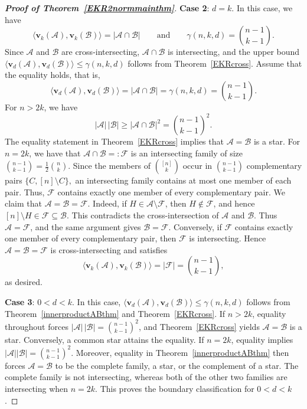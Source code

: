 \documentclass[11pt]{article}
\numberwithin{equation}{section}
\def\A{\mathcal{A}}
\def\B{\mathcal{B}}
\def\F{\mathcal{F}}
\def\v{\mathbf{v}}
\begin{document}
\begin{proof}[{\bf Proof of Theorem~\ref{EKR2normmainthm}}]
{\bf Case 2}: $d=k$.
In this case, we have
\[
\big\langle\mathbf{v}_k(\mathcal{A}),
\mathbf{v}_k(\mathcal{B})\big\rangle
=|\mathcal{A}\cap\mathcal{B}|
\qquad\text{and}\qquad
\gamma(n,k,d)=\binom{n-1}{k-1}.
\]
Since $\mathcal{A}$ and $\mathcal{B}$ are cross-intersecting,
$\mathcal{A}\cap\mathcal{B}$ is intersecting, and the upper bound $\big\langle\mathbf{v}_{d}(\A),\mathbf{v}_{d}(\B)\big\rangle
\leq \gamma(n,k,d)$
follows from Theorem~\ref{EKRcross}.
Assume that the equality holds, that is,
$$\big\langle\mathbf{v}_{d}(\A),\mathbf{v}_{d}(\B)\big\rangle
=|\mathcal{A}\cap\mathcal{B}|= \gamma(n,k,d)=\binom{n-1}{k-1}.$$
For $n>2k$, we have
\[
|\mathcal{A}|\,|\mathcal{B}|
\geq|\mathcal{A}\cap\mathcal{B}|^2
=\binom{n-1}{k-1}^2.
\]
The equality statement in Theorem~\ref{EKRcross} implies that
$\mathcal{A}=\mathcal{B}$ is a star.
For $n=2k$, we have that
$\mathcal A\cap\mathcal B=:\mathcal F$ is an intersecting family of
size $\binom{n-1}{k-1}= \frac{1}{2}\binom{n}{k}$.
Since the members of $\binom{[n]}{k}$ occur in $\binom{n-1}{k-1}$ complementary pairs
$
 \{C,[n]\setminus C\},
$
an intersecting family contains at most one member of each pair.
Thus, $\F$ contains exactly one member of every complementary pair.
We claim that $\A=\B=\F$.  Indeed, if
$H\in\A\setminus\F$, then $H\notin\F$, and hence
$[n]\setminus H\in\F\subseteq\B$.  This contradicts the
cross-intersection of $\A$ and $\B$.  Thus $\A=\F$, and the same
argument gives $\B=\F$.
Conversely, if $\F$ contains exactly one member of every
complementary pair, then $\F$ is intersecting.
Hence
$\A=\B=\F$ is cross-intersecting and satisfies
\[
 \big\langle\v_k(\A),\v_k(\B)\big\rangle
 =|\F|=\binom{n-1}{k-1},
\]
as desired.

{\bf Case 3}: $0<d<k$.
In this case,
$\big\langle\mathbf{v}_d(\mathcal{A}),
\mathbf{v}_d(\mathcal{B})\big\rangle
\leq \gamma(n,k,d)$ follows from Theorem~\ref{innerproductABthm} and Theorem~\ref{EKRcross}.
If $n>2k$, equality throughout forces
$|\mathcal{A}|\,|\mathcal{B}|=\binom{n-1}{k-1}^2$, and
Theorem~\ref{EKRcross} yields $\mathcal{A}=\mathcal{B}$ is a star.
Conversely, a common star attains the equality.
If $n=2k$, equality implies
$|\mathcal A||\mathcal B|=\binom{n-1}{k-1}^2$.
Moreover, equality in Theorem~\ref{innerproductABthm} then forces
$\mathcal A=\mathcal B$ to be the complete family, a star, or the
complement of a star.
The complete family is not intersecting, whereas both of the other two families are intersecting when $n=2k$.
This proves the boundary classification for $0<d<k$.




\end{proof}
\end{document}
